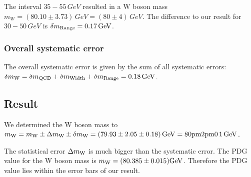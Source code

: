 The interval $35 - 55\,\si{GeV}$ resulted in a W boson mass $m_W = (80.10
\pm 3.73)\,\si{GeV} = (80 \pm 4)\,\si{GeV}$. The difference to our result for $30 - 50\,\si{GeV}$ is $\delta m\ind{Range} = 0.17\,\si{GeV}$.

\subsubsection{Overall systematic error}
The overall systematic error is given by the sum of all systematic errors: $\delta m\ind{W} = \delta m\ind{QCD} + \delta m\ind{Width} + \delta m\ind{Range} = 0.18\, \si{GeV}$. 
 
\subsection{Result}

We determined the W boson mass to $m\ind{W} = m\ind{W} \pm \Delta m\ind{W} \pm \delta m\ind{W} = (79.93 \pm 2.05 \pm 0.18)\, \si{GeV} = \si{80 \pm 2 \pm 0.1}\, \si{GeV}$.

The statistical error $\Delta m\ind{W}$ is much bigger than the systematic error. The PDG value for the W boson mass is $m\ind{W} = (80.385 \pm 0.015) \si{GeV}$\cite{pdg}. Therefore the PDG value lies within the error bars of our result.
 
 